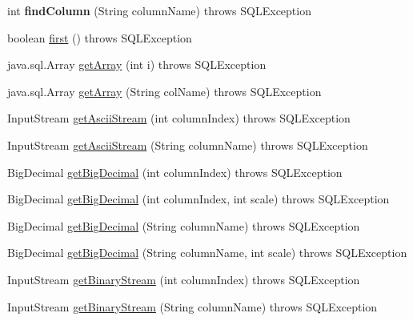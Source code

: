 \begin{DoxyCompactItemize}
int {\bfseries find\+Column} (String column\+Name)  throws S\+Q\+L\+Exception 
\item 
boolean \mbox{\hyperlink{classcom_1_1mysql_1_1jdbc_1_1_result_set_impl_ad95952bb64306d825909c08271282c6f}{first}} ()  throws S\+Q\+L\+Exception 
\item 
java.\+sql.\+Array \mbox{\hyperlink{classcom_1_1mysql_1_1jdbc_1_1_result_set_impl_a6b06205205974e4964705258ce1c90df}{get\+Array}} (int i)  throws S\+Q\+L\+Exception 
\item 
java.\+sql.\+Array \mbox{\hyperlink{classcom_1_1mysql_1_1jdbc_1_1_result_set_impl_a47d8389da497a88335d4ef11c611e8f7}{get\+Array}} (String col\+Name)  throws S\+Q\+L\+Exception 
\item 
Input\+Stream \mbox{\hyperlink{classcom_1_1mysql_1_1jdbc_1_1_result_set_impl_a3121b8b483b8b8bfcdf6b1b977a60808}{get\+Ascii\+Stream}} (int column\+Index)  throws S\+Q\+L\+Exception 
\item 
Input\+Stream \mbox{\hyperlink{classcom_1_1mysql_1_1jdbc_1_1_result_set_impl_a87d456ff8fb48adfb5a12005afc51787}{get\+Ascii\+Stream}} (String column\+Name)  throws S\+Q\+L\+Exception 
\item 
Big\+Decimal \mbox{\hyperlink{classcom_1_1mysql_1_1jdbc_1_1_result_set_impl_a9a92d1b3d8bb0aaf7dce5b5c6b225bd9}{get\+Big\+Decimal}} (int column\+Index)  throws S\+Q\+L\+Exception 
\item 
Big\+Decimal \mbox{\hyperlink{classcom_1_1mysql_1_1jdbc_1_1_result_set_impl_a8e04cde19c0b2817791ffb7a2c8fe576}{get\+Big\+Decimal}} (int column\+Index, int scale)  throws S\+Q\+L\+Exception 
\item 
Big\+Decimal \mbox{\hyperlink{classcom_1_1mysql_1_1jdbc_1_1_result_set_impl_a0961f23e3e7323a9ca5b31d029cb2b73}{get\+Big\+Decimal}} (String column\+Name)  throws S\+Q\+L\+Exception 
\item 
Big\+Decimal \mbox{\hyperlink{classcom_1_1mysql_1_1jdbc_1_1_result_set_impl_af0f4488c8af3d0ce0ca5c9e38c265365}{get\+Big\+Decimal}} (String column\+Name, int scale)  throws S\+Q\+L\+Exception 
\item 
Input\+Stream \mbox{\hyperlink{classcom_1_1mysql_1_1jdbc_1_1_result_set_impl_a59faa6b2172c9dafdc26ea397bc4fc93}{get\+Binary\+Stream}} (int column\+Index)  throws S\+Q\+L\+Exception 
\item 
Input\+Stream \mbox{\hyperlink{classcom_1_1mysql_1_1jdbc_1_1_result_set_impl_a903fb401d883a4fcfbe7a96b561efbe0}{get\+Binary\+Stream}} (String column\+Name)  throws S\+Q\+L\+Exception 
\item 

\end{DoxyCompactItemize}
